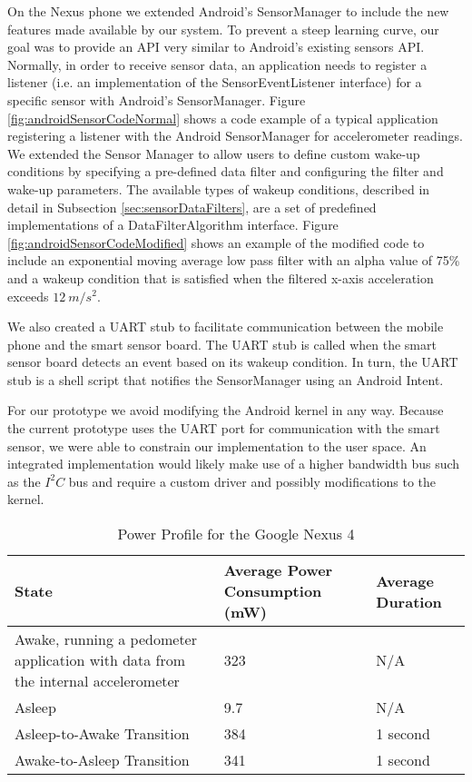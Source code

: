 On the Nexus phone we extended Android's SensorManager to include the new features made available by our system. To prevent a steep learning curve, our goal was to provide an API very similar to Android's existing sensors API. Normally, in order to receive sensor data, an application needs to register a listener (i.e. an implementation of the SensorEventListener interface) for a specific sensor with Android's SensorManager. Figure \ref{fig:androidSensorCodeNormal} shows a code example of a typical application registering a listener with the Android SensorManager for accelerometer readings. We extended the Sensor Manager to allow users to define custom wake-up conditions by specifying a pre-defined data filter and configuring the filter and wake-up parameters. The available types of wakeup conditions, described in detail in Subsection \ref{sec:sensorDataFilters}, are a set of predefined implementations of a DataFilterAlgorithm interface. Figure \ref{fig:androidSensorCodeModified} shows an example of the modified code to include an exponential moving average low pass filter with an alpha value of 75\% and a wakeup condition that is satisfied when the filtered x-axis acceleration exceeds $12\:m/s^2$.

We also created a UART stub to facilitate communication between the mobile phone and the smart sensor board. The UART stub is called when the smart sensor board detects an event based on its wakeup condition. In turn, the UART stub is a shell script that notifies the SensorManager using an Android Intent\cite{androidintents}.

For our prototype we avoid modifying the Android kernel in any way. Because the current prototype uses the UART port for communication with the smart sensor, we were able to constrain our implementation to the user space. An integrated implementation would likely make use of a higher bandwidth bus such as the $I^2C$ bus and require a custom driver and possibly modifications to the kernel.

\begin{table*}[t]
	\begin{tabular}{| p{7cm} | l | l |}
		\hline
		State & Average Power Consumption (mW) & Average Duration \\ \hline
		Awake, running a pedometer application with data from the internal accelerometer & 323 & N/A \\ \hline
		Asleep & 9.7 & N/A \\ \hline
		Asleep-to-Awake Transition & 384 & 1 second \\ \hline
		Awake-to-Asleep Transition & 341 & 1 second \\ \hline
	\end{tabular}
	\caption{Power Profile for the Google Nexus 4}
	\label{table:powerProfileNexus}
\end{table*}

